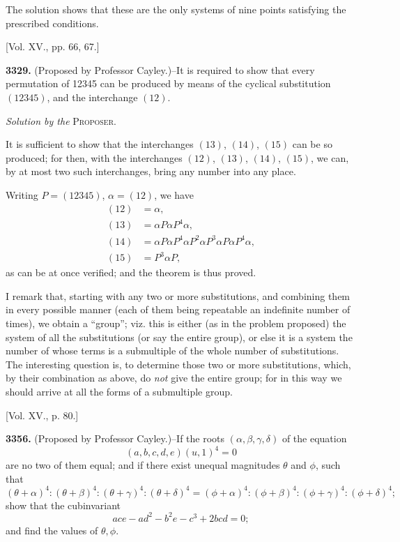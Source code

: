 \documentclass[10pt]{article}
\begin{document}
The solution shows that these are the only systems of nine points satisfying
the prescribed conditions.

\begin{center}
[Vol. XV., pp. 66, 67.]
\end{center}

\noindent
\textbf{3329.} (Proposed by Professor Cayley.)--It is required to show that
every permutation of 12345 can be produced by means of the cyclical substitution
$(12345)$, and the interchange $(12)$.

\begin{center}
\emph{Solution by the} \textsc{Proposer}.
\end{center}

\noindent
It is sufficient to show that the interchanges $(13)$, $(14)$, $(15)$ can be so
produced; for then, with the interchanges $(12)$, $(13)$, $(14)$, $(15)$, we
can, by at most two such interchanges, bring any number into any place.

Writing $P=(12345)$, $\alpha=(12)$, we have
\[
\begin{aligned}
(12)&=\alpha,\\
(13)&=\alpha P\alpha P^4\alpha,\\
(14)&=\alpha P\alpha P^4\alpha P^2\alpha P^3\alpha P\alpha P^4\alpha,\\
(15)&=P^3\alpha P,
\end{aligned}
\]
as can be at once verified; and the theorem is thus proved.

I remark that, starting with any two or more substitutions, and combining them
in every possible manner (each of them being repeatable an indefinite number of
times), we obtain a ``group''; viz. this is either (as in the problem proposed)
the system of all the substitutions (or say the entire group), or else it is a
system the number of whose terms is a submultiple of the whole number of
substitutions. The interesting question is, to determine those two or more
substitutions, which, by their combination as above, do \emph{not} give the
entire group; for in this way we should arrive at all the forms of a
submultiple group.

\begin{center}
[Vol. XV., p. 80.]
\end{center}

\noindent
\textbf{3356.} (Proposed by Professor Cayley.)--If the roots
$(\alpha,\beta,\gamma,\delta)$ of the equation
\[
        (a,b,c,d,e)(u,1)^4=0
\]
are no two of them equal; and if there exist unequal magnitudes $\theta$ and
$\phi$, such that
\[
(\theta+\alpha)^4:(\theta+\beta)^4:(\theta+\gamma)^4:(\theta+\delta)^4
=
(\phi+\alpha)^4:(\phi+\beta)^4:(\phi+\gamma)^4:(\phi+\delta)^4;
\]
show that the cubinvariant
\[
        ace-ad^2-b^2e-c^3+2bcd=0;
\]
and find the values of $\theta,\phi$.
\end{document}
